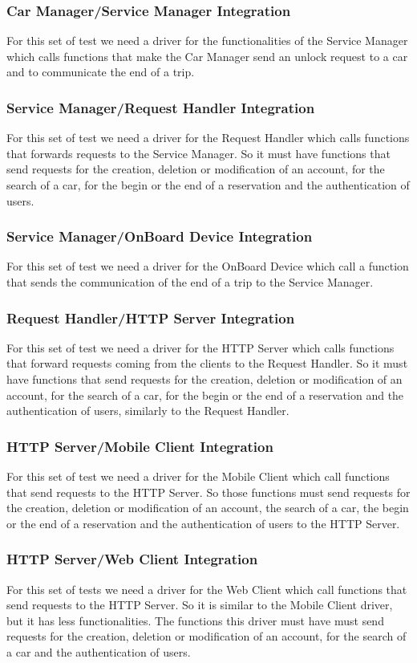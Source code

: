 \subsubsection{Car Manager/Service Manager Integration}
For this set of test we need a driver for the functionalities of the Service Manager which calls functions that make the Car Manager send an unlock request to a car and to communicate the end of a trip.
\subsubsection{Service Manager/Request Handler Integration}
For this set of test we need a driver for the Request Handler which calls functions that forwards requests to the Service Manager. So it must have functions that send requests for the creation, deletion or modification of an account, for the search of a car, for the begin or the end of a reservation and the authentication of users.
\subsubsection{Service Manager/OnBoard Device Integration}
For this set of test we need a driver for the OnBoard Device which call a function that sends the communication of the end of a trip to the Service Manager.
\subsubsection{Request Handler/HTTP Server Integration}
For this set of test we need a driver for the HTTP Server which calls functions that forward requests coming from the clients to the Request Handler. So it must have functions that send requests for the creation, deletion or modification of an account, for the search of a car, for the begin or the end of a reservation and the authentication of users, similarly to the Request Handler.
\subsubsection{HTTP Server/Mobile Client Integration}
For this set of test we need a driver for the Mobile Client which call functions that send requests to the HTTP Server. So those functions must send requests for the creation, deletion or modification of an account, the search of a car, the begin or the end of a reservation and the authentication of users to the HTTP Server.
\subsubsection{HTTP Server/Web Client Integration}
For this set of tests we need a driver for the Web Client which call functions that send requests to the HTTP Server. So it is similar to the Mobile Client driver, but it has less functionalities. The functions this driver must have must send  requests for the creation, deletion or modification of an account, for the search of a car and the authentication of users.

